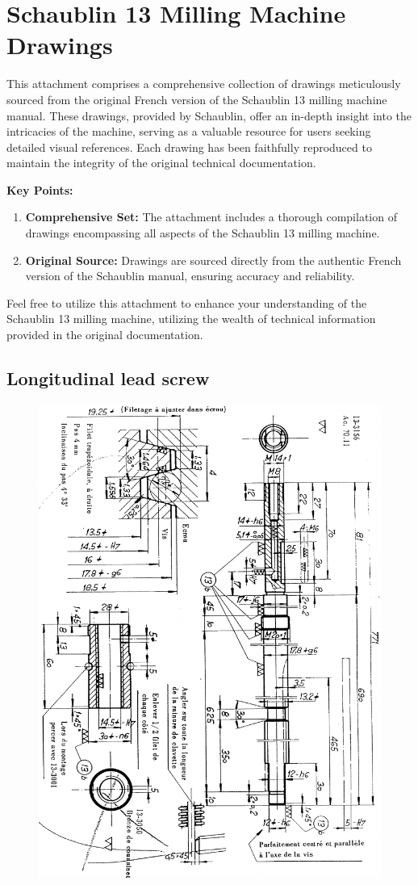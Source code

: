 \chapter{Schaublin 13 Milling Machine Drawings}

This attachment comprises a comprehensive collection of drawings meticulously sourced from the original French version of the Schaublin 13 milling machine manual. These drawings, provided by Schaublin, offer an in-depth insight into the intricacies of the machine, serving as a valuable resource for users seeking detailed visual references. Each drawing has been faithfully reproduced to maintain the integrity of the original technical documentation.

\textbf{Key Points:}
\begin{enumerate}
    \item \textbf{Comprehensive Set:} The attachment includes a thorough compilation of drawings encompassing all aspects of the Schaublin 13 milling machine.

    \item \textbf{Original Source:} Drawings are sourced directly from the authentic French version of the Schaublin manual, ensuring accuracy and reliability.
\end{enumerate}

Feel free to utilize this attachment to enhance your understanding of the Schaublin 13 milling machine, utilizing the wealth of technical information provided in the original documentation.

\newpage


\section{Longitudinal lead screw}

\begin{figure}[ht]
    \centering
    \includegraphics[width=.87\linewidth]{images/page_66}
    \label{fig:page_66}
\end{figure}